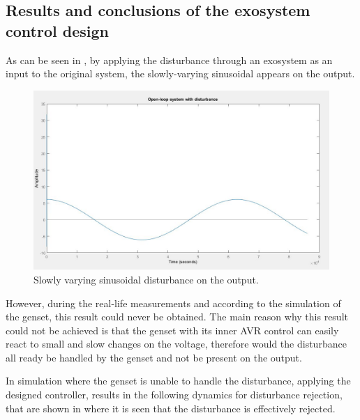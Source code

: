 \subsection{Results and conclusions of the exosystem control design}
\label{Exo_result}

As can be seen in , by applying the disturbance through an exosystem as an input to the original system, the slowly-varying sinusoidal appears on the output.

\begin{figure}[H]
\centering
\includegraphics[width=1.1\textwidth]{rapport/billeder/temporary/sinusdist}
\caption{Slowly varying sinusoidal disturbance on the output.}
\label{fig:sin_disturbance}
\end{figure}

However, during the real-life measurements and according to the simulation of the genset, this result could never be obtained. The main reason why this result could not be achieved is that the genset with its inner AVR control can easily react to small and slow changes on the voltage, therefore would the disturbance all ready be handled by the genset and not be present on the output. 

In simulation where the genset is unable to handle the disturbance, applying the designed controller, results in the following dynamics for disturbance rejection, that are shown in  where it is seen that the disturbance is effectively rejected. 

